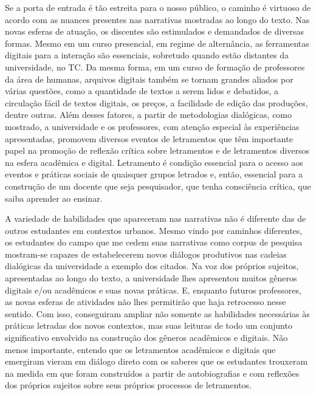 \documentclass{textolivre}
\begin{document}
Se a porta de entrada é tão estreita para o nosso público, o caminho é virtuoso de acordo com as nuances presentes nas narrativas mostradas ao longo do texto. Nas novas esferas de atuação, os discentes são estimulados e demandados de diversas formas. Mesmo em um curso presencial, em regime de alternância, as ferramentas digitais para a interação são essenciais, sobretudo quando estão distantes da universidade, no TC. Da mesma forma, em um curso de formação de professores da área de humanas, arquivos digitais também se tornam grandes aliados por várias questões, como a quantidade de textos a serem lidos e debatidos, a circulação fácil de textos digitais, os preços, a facilidade de edição das produções, dentre outras. Além desses fatores, a partir de metodologias dialógicas, como mostrado, a universidade e os professores, com atenção especial às experiências apresentadas, promovem diversos eventos de letramentos que têm importante papel na promoção de reflexão crítica sobre letramentos e de letramentos diversos na esfera acadêmica e digital. Letramento é condição essencial para o acesso aos eventos e práticas sociais de quaisquer grupos letrados e, então, essencial para a construção de um docente que seja pesquisador, que tenha consciência crítica, que saiba aprender ao ensinar.

A variedade de habilidades que apareceram nas narrativas não é diferente das de outros estudantes em contextos urbanos. Mesmo vindo por caminhos diferentes, os estudantes do campo que me cedem suas narrativas como corpus de pesquisa mostram-se capazes de estabelecerem novos diálogos produtivos nas cadeias dialógicas da universidade a exemplo dos citados. Na voz dos próprios sujeitos, apresentadas ao longo do texto, a universidade lhes apresentou muitos gêneros digitais e/ou acadêmicos e suas novas práticas. E, enquanto futuros professores, as novas esferas de atividades não lhes permitirão que haja retrocesso nesse sentido. Com isso, conseguiram ampliar não somente as habilidades necessárias às práticas letradas dos novos contextos, mas suas leituras de todo um conjunto significativo envolvido na construção dos gêneros acadêmicos e digitais. Não menos importante, entendo que os letramentos acadêmicos e digitais que emergiram vieram em diálogo direto com os saberes que os estudantes trouxeram na medida em que foram construídos a partir de autobiografias e com reflexões dos próprios sujeitos sobre seus próprios processos de letramentos.
\end{document}
